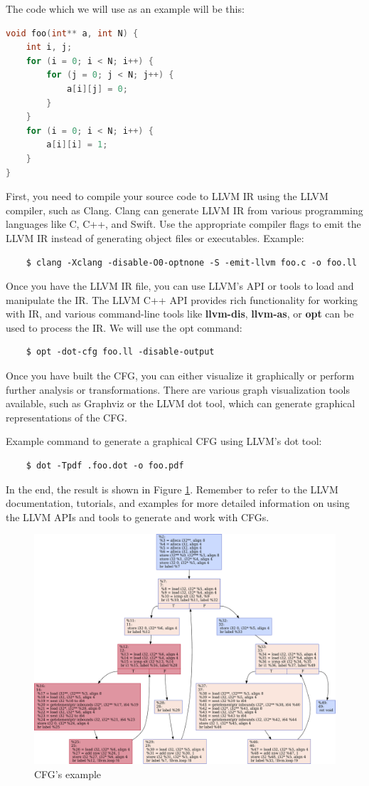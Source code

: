 The code which we will use as an example will be this:

\begin{lstlisting}[language=C++]
void foo(int** a, int N) {
    int i, j;
    for (i = 0; i < N; i++) {
        for (j = 0; j < N; j++) {
            a[i][j] = 0;
        }
    }
    for (i = 0; i < N; i++) {
        a[i][i] = 1;
    }
}
\end{lstlisting}

First, you need to compile your source code to LLVM IR using the LLVM compiler, such as Clang. Clang can generate LLVM IR from various programming languages like C, C++, and Swift. Use the appropriate compiler flags to emit the LLVM IR instead of generating object files or executables. Example:

\begin{verbatim}
    $ clang -Xclang -disable-O0-optnone -S -emit-llvm foo.c -o foo.ll
\end{verbatim}

Once you have the LLVM IR file, you can use LLVM's API or tools to load and manipulate the IR. The LLVM C++ API provides rich functionality for working with IR, and various command-line tools like \textbf{llvm-dis}, \textbf{llvm-as}, or \textbf{opt} can be used to process the IR. We will use the opt command:

\begin{verbatim}
    $ opt -dot-cfg foo.ll -disable-output
\end{verbatim}

Once you have built the CFG, you can either visualize it graphically or perform further analysis or transformations. There are various graph visualization tools available, such as Graphviz or the LLVM dot tool, which can generate graphical representations of the CFG.

Example command to generate a graphical CFG using LLVM's dot tool:

\begin{verbatim}
    $ dot -Tpdf .foo.dot -o foo.pdf
\end{verbatim}

In the end, the result is shown in Figure \ref{fig:cfg_foo}. Remember to refer to the LLVM documentation, tutorials, and examples for more detailed information on using the LLVM APIs and tools to generate and work with CFGs.

\begin{figure}[!ht]
    \centering
    \includegraphics[width=\textwidth]{images/cfg.pdf}
    \caption{CFG's example}
    \label{fig:cfg_foo}
\end{figure}